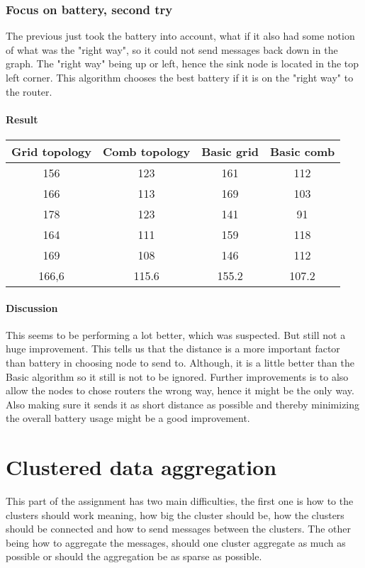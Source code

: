 \documentclass{article}
\begin{document}
\section{Focus on battery, second try}
  The previous just took the battery into account, what if it also had
  some notion of what was the "right way", so it could not send messages
  back down in the graph. The "right way" being up or left, hence the sink
  node is located in the top left corner. This algorithm chooses the best
  battery if it is on the "right way" to the router.
  \subsection{Result}
    \begin{tabular}{c|c||c|c}
      Grid topology & Comb topology & Basic grid & Basic comb\\
      \hline
      \hline
      156 & 123 & 161 & 112\\
      166 & 113 & 169 & 103\\
      178 & 123 & 141 & 91 \\
      164 & 111 & 159 & 118\\
      169 & 108 & 146 & 112\\
      \hline
      166,6&115.6&155.2&107.2\\
    \end{tabular}
    \subsection{Discussion}
     This seems to be performing a lot better, which was suspected. But still not a huge
     improvement. This tells us that the distance is a more important factor than battery
     in choosing node to send to. Although, it is a little better than the Basic algorithm
     so it still is not to be ignored.
     Further improvements is to also allow the nodes to chose routers the wrong way, hence 
     it might be the only way. Also making sure it sends it as short distance as possible
     and thereby minimizing the overall battery usage might be a good improvement.
     
\part{Clustered data aggregation}
  This part of the assignment has two main difficulties, the first one is 
  how to the clusters should work meaning, how big the cluster should be, how the clusters
  should be connected and how to send messages between the clusters.
  The other being how to aggregate the messages, should one cluster aggregate as much
  as possible or should the aggregation be as sparse as possible.
\end{document}
